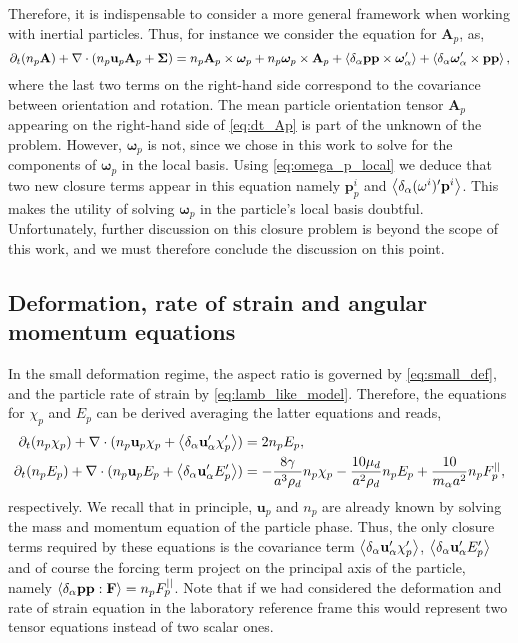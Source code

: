 Therefore, it is indispensable to consider a more general framework when working with inertial particles. 
Thus, for instance we consider the equation for $\textbf{A}_p$, as, 
\begin{equation*}
    \partial_t (n_p\textbf{A})
    + \mathbf{\nabla}\cdot (
        n_p\textbf{u}_p\textbf{A}_p
        + \mathbf{\Sigma}
        )
    =
    n_p \textbf{A}_p \times \bm\omega_p
    + n_p \bm\omega_p \times \textbf{A}_p
    + \left<\delta_\alpha \textbf{pp} \times \bm\omega_\alpha'\right>
    + \left<\delta_\alpha \bm\omega_\alpha' \times \textbf{pp}\right>,
    \label{eq:dt_Ap}
\end{equation*}
where the last two terms on the right-hand side correspond to the covariance between orientation and rotation. 
The mean particle orientation tensor $\textbf{A}_p$ appearing on the right-hand side of \ref{eq:dt_Ap} is part of the unknown of the problem.
However, $\bm\omega_p$ is not, since we chose in this work to solve for the components of $\bm\omega_p$ in the local basis. 
Using \ref{eq:omega_p_local} we deduce that two new closure terms appear in this equation namely $\textbf{p}_p^i$ and $\left<\delta_\alpha (\omega^i)' \textbf{p}^i\right>$. 
This makes the utility of solving $\bm\omega_p$ in the particle's local basis doubtful. 
Unfortunately, further discussion on this closure problem is beyond the scope of this work, and we must therefore conclude the discussion on this point.

\subsection{Deformation, rate of strain and angular momentum equations}

In the small deformation regime, the aspect ratio is governed by \ref{eq:small_def}, and the particle rate of strain by  \ref{eq:lamb_like_model}. 
Therefore, the equations for $\chi_p$ and $E_p$ can be derived averaging the latter equations and reads,  
\begin{align}
    \partial_t (n_p \chi_p)
    + \mathbf{\nabla}\cdot (
        n_p \textbf{u}_p \chi_p 
        + \left<\delta_\alpha \textbf{u}_\alpha' \chi_p'\right>
    )
    &= 2 n_p E_p,
    \label{eq:avg_chi_I}
    \\
    \partial_t (n_p E_p)
    + \mathbf{\nabla}\cdot (
        n_p \textbf{u}_p E_p 
        + \left<\delta_\alpha \textbf{u}_\alpha' E_p'\right>
    )
    &= 
    - \frac{8 \gamma }{a^3\rho_d} n_p \chi_p
    - \frac{10 \mu_d}{a^2\rho_d} n_p E_p
    + \frac{10}{m_\alpha a^2} n_p F^{||}_p,
    \label{eq:avg_E_I}
\end{align}
respectively.
We recall that in principle, $\textbf{u}_p$ and $n_p$ are already known by solving the mass and momentum equation of the particle phase.
Thus, the only closure terms required by these equations is the covariance term $\left<\delta_\alpha \textbf{u}_\alpha' \chi_p'\right>$, $ \left<\delta_\alpha \textbf{u}_\alpha' E_p'\right>$ and of course the forcing term project on the principal axis of the particle, namely $\left<\delta_\alpha \textbf{pp} : \textbf{F}\right> = n_p F_p^{||}$. 
Note that if we had considered the deformation and rate of strain equation in the laboratory reference frame this would represent two tensor equations instead of two scalar ones. 


